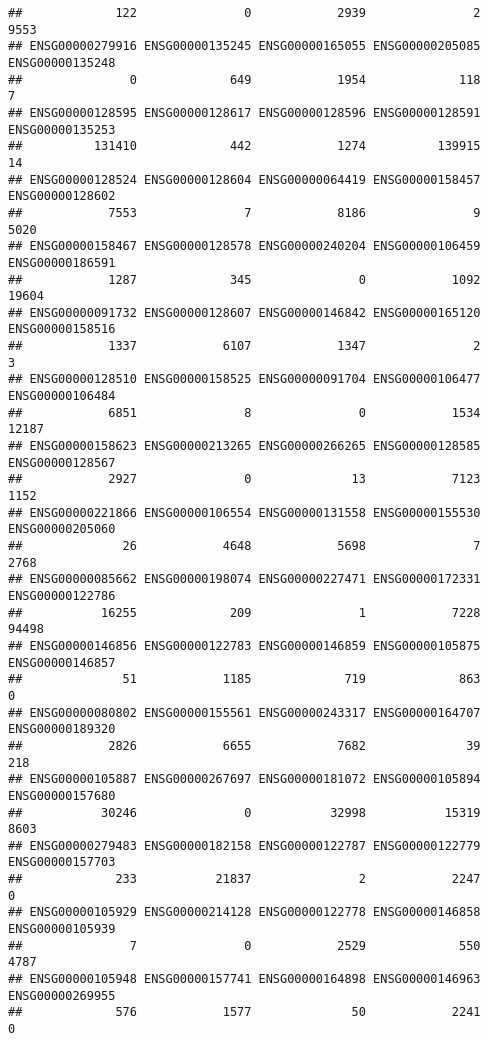 \documentclass[
]{article}
\begin{document}
\begin{verbatim}
##             122               0            2939               2            9553 
## ENSG00000279916 ENSG00000135245 ENSG00000165055 ENSG00000205085 ENSG00000135248 
##               0             649            1954             118               7 
## ENSG00000128595 ENSG00000128617 ENSG00000128596 ENSG00000128591 ENSG00000135253 
##          131410             442            1274          139915              14 
## ENSG00000128524 ENSG00000128604 ENSG00000064419 ENSG00000158457 ENSG00000128602 
##            7553               7            8186               9            5020 
## ENSG00000158467 ENSG00000128578 ENSG00000240204 ENSG00000106459 ENSG00000186591 
##            1287             345               0            1092           19604 
## ENSG00000091732 ENSG00000128607 ENSG00000146842 ENSG00000165120 ENSG00000158516 
##            1337            6107            1347               2               3 
## ENSG00000128510 ENSG00000158525 ENSG00000091704 ENSG00000106477 ENSG00000106484 
##            6851               8               0            1534           12187 
## ENSG00000158623 ENSG00000213265 ENSG00000266265 ENSG00000128585 ENSG00000128567 
##            2927               0              13            7123            1152 
## ENSG00000221866 ENSG00000106554 ENSG00000131558 ENSG00000155530 ENSG00000205060 
##              26            4648            5698               7            2768 
## ENSG00000085662 ENSG00000198074 ENSG00000227471 ENSG00000172331 ENSG00000122786 
##           16255             209               1            7228           94498 
## ENSG00000146856 ENSG00000122783 ENSG00000146859 ENSG00000105875 ENSG00000146857 
##              51            1185             719             863               0 
## ENSG00000080802 ENSG00000155561 ENSG00000243317 ENSG00000164707 ENSG00000189320 
##            2826            6655            7682              39             218 
## ENSG00000105887 ENSG00000267697 ENSG00000181072 ENSG00000105894 ENSG00000157680 
##           30246               0           32998           15319            8603 
## ENSG00000279483 ENSG00000182158 ENSG00000122787 ENSG00000122779 ENSG00000157703 
##             233           21837               2            2247               0 
## ENSG00000105929 ENSG00000214128 ENSG00000122778 ENSG00000146858 ENSG00000105939 
##               7               0            2529             550            4787 
## ENSG00000105948 ENSG00000157741 ENSG00000164898 ENSG00000146963 ENSG00000269955 
##             576            1577              50            2241               0 

\end{verbatim}
\end{document}
